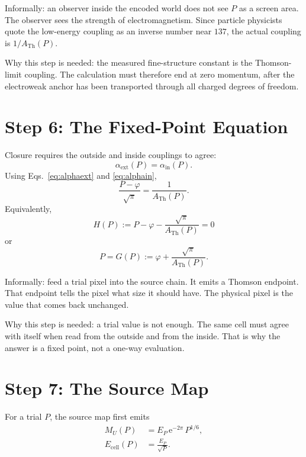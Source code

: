 \documentclass[11pt]{article}
\theoremstyle{remark}
\newcommand{\e}{\mathrm e}
\newcommand{\ATh}{A_{\mathrm{Th}}}
\begin{document}
Informally: an observer inside the encoded world does not see \(P\) as a screen area. The observer sees the strength of electromagnetism. Since particle physicists quote the low-energy coupling as an inverse number near \(137\), the actual coupling is \(1/\ATh(P)\).

Why this step is needed: the measured fine-structure constant is the Thomson-limit coupling. The calculation must therefore end at zero momentum, after the electroweak anchor has been transported through all charged degrees of freedom.

\section{Step 6: The Fixed-Point Equation}

Closure requires the outside and inside couplings to agree:
\begin{equation}
\alpha_{\mathrm{ext}}(P)=\alpha_{\mathrm{in}}(P).
\label{eq:couplingmatch}
\end{equation}
Using Eqs.~\eqref{eq:alphaext} and \eqref{eq:alphain},
\begin{equation}
\frac{P-\varphi}{\sqrt\pi}
=
\frac{1}{\ATh(P)}.
\end{equation}
Equivalently,
\begin{equation}
\boxed{
H(P):=P-\varphi-\frac{\sqrt\pi}{\ATh(P)}=0
}
\label{eq:H}
\end{equation}
or
\begin{equation}
\boxed{
P=G(P):=\varphi+\frac{\sqrt\pi}{\ATh(P)}.
}
\label{eq:G}
\end{equation}

Informally: feed a trial pixel into the source chain. It emits a Thomson endpoint. That endpoint tells the pixel what size it should have. The physical pixel is the value that comes back unchanged.

Why this step is needed: a trial value is not enough. The same cell must agree with itself when read from the outside and from the inside. That is why the answer is a fixed point, not a one-way evaluation.

\section{Step 7: The Source Map}

For a trial \(P\), the source map first emits
\begin{align}
M_U(P)&=E_P\,\e^{-2\pi}\,P^{1/6},
\label{eq:MU}\\
E_{\mathrm{cell}}(P)&=\frac{E_P}{\sqrt P}.
\label{eq:Ecell}
\end{align}
\end{document}

